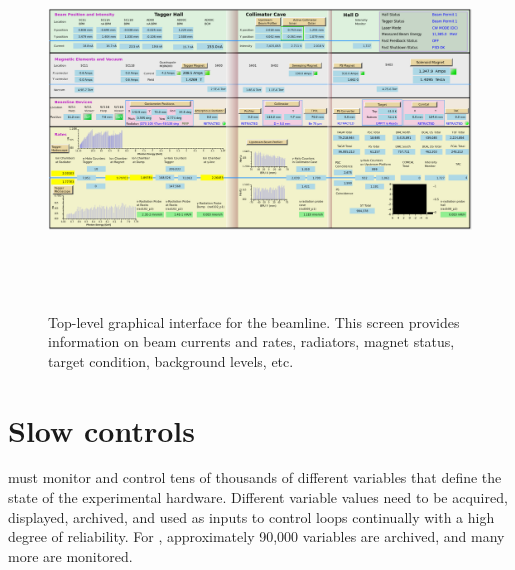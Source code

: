
\begin{landscape}
 \begin{figure}[tbp]
\begin{center}
\includegraphics[height=10cm,clip=true]{figures/GlueX_CSS_overview.png}
\caption{Top-level graphical interface for the beamline. This screen provides information on beam currents and rates, radiators, magnet status, target condition, background levels, etc.
\label{fig:GlueX_CSS_overview}
}
\end{center}
\end{figure}
\end{landscape}

\section[Slow controls]{Slow controls \label{sec:controls}}
\GX{} must monitor 
and control tens of thousands of different variables that define the state of the experimental hardware. Different variable values need to be acquired, displayed, archived, and used as inputs to control loops continually with a high degree of reliability. For \gx, approximately 90,000 variables are archived, and many more are monitored.

